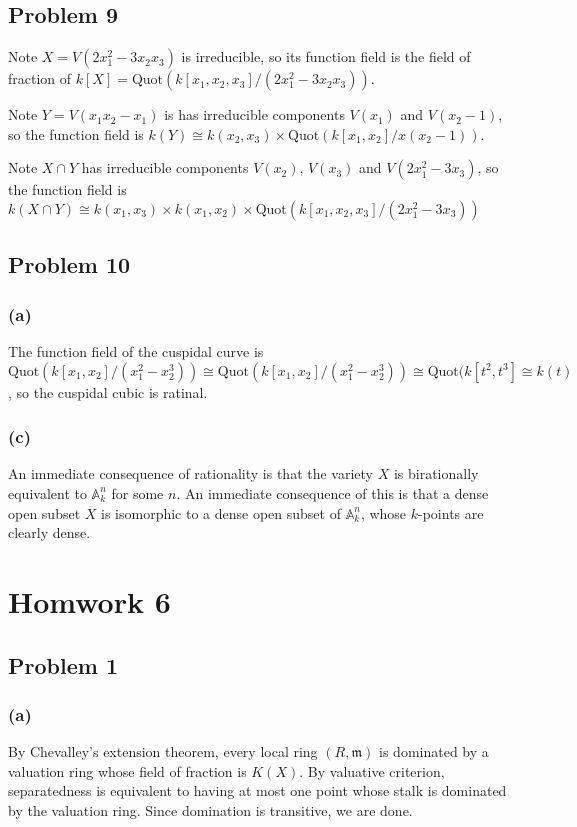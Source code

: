 \documentclass{article}
\theoremstyle{definition}
\theoremstyle{definition}
\theoremstyle{definition}
\theoremstyle{definition}
\theoremstyle{definition}
\theoremstyle{definition}
\theoremstyle{definition}
\begin{document}
\subsection*{Problem 9}
Note $X=V(2x_1^2-3x_2x_3)$ is irreducible, so its function field is the field of fraction of $k[X]=\textrm{Quot}(k[x_1,x_2,x_3]/(2x_1^2-3x_2x_3))$.

Note $Y=V(x_1x_2-x_1)$ is has irreducible components $V(x_1)$ and $V(x_2-1)$, so the function field is $k(Y)\cong k(x_2,x_3)\times \textrm{Quot}(k[x_1,x_2]/x(x_2-1))$.

Note $X\cap Y$ has irreducible components $V(x_2)$, $V(x_3)$ and $V(2x_1^2-3x_3)$, so the function field is $k(X\cap Y)\cong k(x_1,x_3)\times k(x_1,x_2)\times \textrm{Quot}(k[x_1,x_2,x_3]/(2x_1^2-3x_3))$


\subsection*{Problem 10}
\subsubsection*{(a)}
The function field of the cuspidal curve is \[\textrm{Quot}(k[x_1,x_2]/(x_1^2-x_2^3))\cong \textrm{Quot}(k[x_1,x_2]/(x_1^2-x_2^3))\cong \textrm{Quot}(k[t^2,t^3]\cong k(t)\], so the cuspidal cubic is ratinal.

\subsubsection*{(c)}
An immediate consequence of rationality is that the variety $X$ is birationally equivalent to $\mathbb{A}_k^n$ for some $n$. An immediate consequence of this is that a dense open subset $X$ is isomorphic to a dense open subset of $\mathbb{A}_k^n$, whose $k$-points are clearly dense. 


\section*{Homwork 6}

\subsection*{Problem 1}
\subsubsection*{(a)}
By Chevalley's extension theorem, every local ring $(R, \mathfrak{m})$ is dominated by a valuation ring whose field of fraction is $K(X)$. By valuative criterion, separatedness is equivalent to having at most one point whose stalk is dominated by the valuation ring. Since domination is transitive, we are done.   
\end{document}
